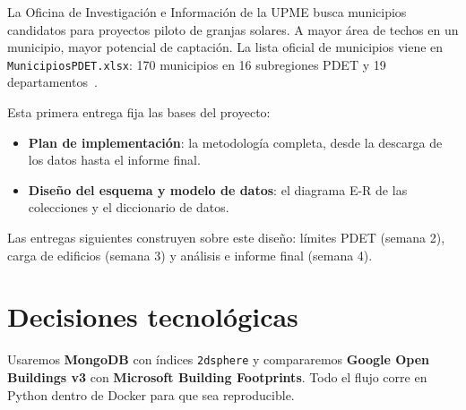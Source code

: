 \documentclass[11pt,a4paper]{article}
\newcommand{\campo}[1]{\texttt{#1}}
\begin{document}
La Oficina de Investigación e Información de la UPME busca municipios
candidatos para proyectos piloto de granjas solares. A mayor
área de techos en un municipio, mayor potencial de captación. La lista oficial
de municipios viene en \campo{MunicipiosPDET.xlsx}: 170 municipios en 16
subregiones PDET y 19 departamentos~\cite{pdet}.

Esta primera entrega fija las bases del proyecto:

\begin{itemize}
  \item \textbf{Plan de implementación}: la metodología completa, desde la
        descarga de los datos hasta el informe final.
  \item \textbf{Diseño del esquema y modelo de datos}: el diagrama E-R de las
        colecciones y el diccionario de datos.
\end{itemize}

Las entregas siguientes construyen sobre este diseño: límites PDET (semana 2),
carga de edificios (semana 3) y análisis e informe final (semana 4).

\section{Decisiones tecnológicas}
\label{sec:decisiones}

Usaremos \textbf{MongoDB} con índices \campo{2dsphere} y compararemos
\textbf{Google Open Buildings v3} con \textbf{Microsoft Building Footprints}.
Todo el flujo corre en Python dentro de Docker para que sea reproducible.
\end{document}
